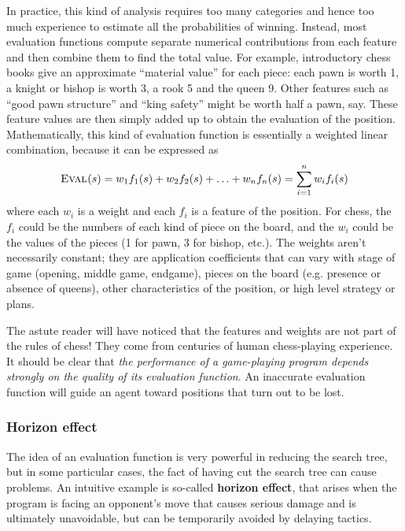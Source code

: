 In practice, this kind of analysis requires too many categories and hence too much experience to estimate all the probabilities of winning. Instead, most evaluation functions compute separate numerical contributions from each feature and then combine them to find the total value. For example, introductory chess books give an approximate ``material value'' for each piece: each pawn is worth 1, a knight or bishop is worth 3, a rook 5 and the queen 9. Other features such as ``good pawn structure'' and ``king safety'' might be worth half a pawn, say. These feature values are then simply added up to obtain the evaluation of the position. Mathematically, this kind of evaluation function is essentially a weighted linear combination, because it can be expressed as
\begin{equation}
\textsc{Eval}\mspace{1mu}(s)=w_1f_1(s)+w_2f_2(s)+\ldots+w_nf_n(s)=\sum_{i=1}^nw_if_i(s)
\end{equation}
where each $w_i$ is a weight and each $f_i$ is a feature of the position. For chess, the $f_i$ could be the numbers of each kind of piece on the board, and the $w_i$ could be the values of the pieces (1 for pawn, 3 for bishop, etc.). The weights aren't necessarily constant; they are application coefficients that can vary with stage of game (opening, middle game, endgame), pieces on the board (e.g. presence or absence of queens), other characteristics of the position, or high level strategy or plans.

The astute reader will have noticed that the features and weights are not part of the rules of chess! They come from centuries of human chess-playing experience. It should be clear that \emph{the performance of a game-playing program depends strongly on the quality of its evaluation function}. An inaccurate evaluation function will guide an agent toward positions that turn out to be lost. 
\subsubsection{Horizon effect}
The idea of an evaluation function is very powerful in reducing the search tree, but in some particular cases, the fact of having cut the search tree can cause problems. An intuitive example is so-called \textbf{horizon effect}, that arises when the program is facing an opponent's move that causes serious damage and is ultimately unavoidable, but can be temporarily avoided by delaying tactics.

